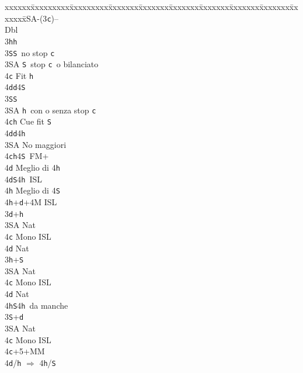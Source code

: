 \documentclass[a4paper,italian]{article}
\newcommand{\BS}{\small{\texttt{S}}}
\newcommand{\BC}{\small{\texttt{c}}}
\newcommand{\BD}{\small{\texttt{d}}}
\newcommand{\BH}{\small{\texttt{h}}}
\newenvironment{bidtable}
{\begin{tabbing}

    xxxxxx\=xxxxxxxxx\=xxxxxxxxx\=xxxxxxx\=xxxxxxx\=xxxxxxx\=xxxxxxx\=xxxxxxx\=xxxxxxx\=xxxxxxx\=\kill}
{\end{tabbing} }%
\begin{document}
\begin{multicols}{2}
\begin{itemize}
    \end{itemize}
    \begin{bidtable}
        1\small{SA}-(3\BC)--\+\\
        Dbl\+\\
        3\BH {}\BH \+\\
        3\BS {}\BS\ no stop \BC \\
        3\small{SA} \BS\ stop \BC\ o bilanciato\\
        4\BC \> Fit \BH \\
        4\BD {}\BD 4\BS \-\\
        3\BS {}\BS \+\\
        3\small{SA} \BH\ con o senza stop \BC \\
        4\BC\BH \> Cue fit \BS \\
        4\BD {}\BD 4\BH \-\\
        3\small{SA} \> No maggiori\+\\
        4\BC {}\BH 4\BS\ FM+\+\\
        4\BD \> Meglio di 4\BH \-\\
        4\BD {}\BS 4\BH\ ISL\+\\
        4\BH \> Meglio di 4\BS \-\\
        4\BH {}+\BD +4M ISL\-\-\\
        3\BD {}+\BH \+\\
        3\small{SA} \> Nat\+\\
        4\BC \> Mono ISL\\
        4\BD \> Nat\-\-\\
        3\BH {}+\BS \+\\
        3\small{SA} \> Nat\+\\
        4\BC \> Mono ISL\\
        4\BD \> Nat\\
        4\BH {}\BS 4\BH\ da manche\-\-\\
        3\BS {}+\BD \+\\
        3\small{SA} \> Nat\+\\
        4\BC \> Mono ISL\-\-\\
        4\BC {}+5+MM\\
        4\BD/\BH \> $\Rightarrow$ 4\BH /\BS \-
    \end{bidtable}
    \columnbreak


\end{multicols}
\end{document}
